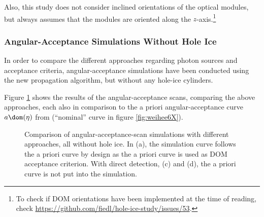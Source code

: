 Also, this study does not consider inclined orientations of the optical modules, but always assumes that the modules are oriented along the $z$-axis.\footnote{To check if DOM orientations have been implemented at the time of reading, check \url{https://github.com/fiedl/hole-ice-study/issues/53}.}



\subsubsection{Angular-Acceptance Simulations Without Hole Ice}
\label{sec:angular_acceptance_simulations_without_hole_ice}

In order to compare the different approaches regarding photon sources and acceptance criteria, angular-acceptance simulations have been conducted using the new propagation algorithm, but without any hole-ice cylinders.


Figure \ref{fig:Shai8yah} shows the results of the angular-acceptance scans, comparing the above approaches, each also in comparison to the a priori angular-acceptance curve $a\dom(\eta)$ from \cite{icepaper} (``nominal'' curve in figure \ref{fig:weihee6X}).

\begin{figure}[htbp]
  \hfill
  \hfill
  \hfill
  \caption{Comparison of angular-acceptance-scan simulations with different approaches, all without hole ice. In (a), the simulation curve follows the a priori curve by design as the a priori curve is used as DOM acceptance criterion. With direct detection, (c) and (d), the a priori curve is not put into the simulation.}
  \label{fig:Shai8yah}
\end{figure}

